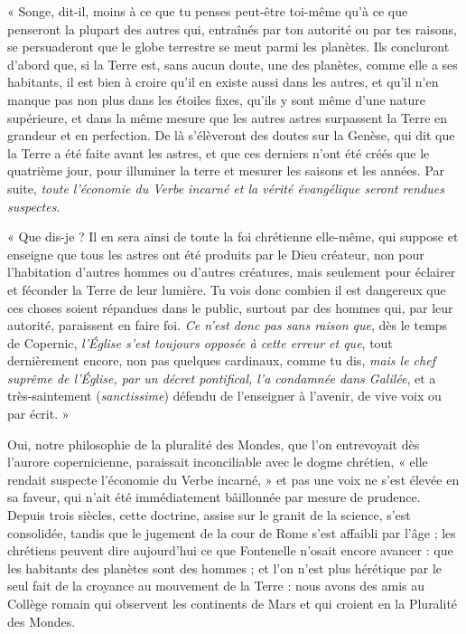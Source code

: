\documentclass[a4paper, 11pt, oneside, landscape]{article}
\begin{document}
« Songe, dit-il, moins à ce que tu penses peut-être toi-même qu'à ce que penseront la plupart des autres qui, entraînés par ton autorité ou par tes raisons, se persuaderont que le globe terrestre se meut parmi les planètes. Ils concluront d'abord que, si la Terre est, sans aucun doute, une des planètes, comme elle a ses habitants, il est bien à croire qu'il en existe aussi dans les autres, et qu'il n'en manque pas non plus dans les étoiles fixes, qu'ils y sont même d'une nature supérieure, et dans la même mesure que les autres astres surpassent la Terre en grandeur et en perfection. De là s'élèveront des doutes sur la Genèse, qui dit que la Terre a été faite avant les astres, et que ces derniers n'ont été créés que le quatrième jour, pour illuminer la terre et mesurer les saisons et les années. Par suite, \emph{toute l'économie du Verbe incarné et la vérité évangélique seront rendues suspectes}.

« Que dis-je ? Il en sera ainsi de toute la foi chrétienne elle-même, qui suppose et enseigne que tous les astres ont été produits par le Dieu créateur, non pour l'habitation d'autres hommes ou d'autres créatures, mais seulement pour éclairer et féconder la Terre de leur lumière. Tu vois donc combien il est dangereux que ces choses soient répandues dans le public, surtout par des hommes qui, par leur autorité, paraissent en faire foi. \emph{Ce n'est donc pas sans raison que}, dès le temps de Copernic, \emph{l'Église s'est toujours opposée à cette erreur et que}, tout dernièrement encore, non pas quelques cardinaux, comme tu dis, \emph{mais le chef suprême de l'Église, par un décret pontifical, l'a condamnée dans Galilée}, et a très-saintement (\emph{sanctissime}) défendu de l'enseigner à l'avenir, de vive voix ou par écrit. »

Oui, notre philosophie de la pluralité des Mondes, que l'on entrevoyait dès l'aurore copernicienne, paraissait inconciliable avec le dogme chrétien, « elle rendait suspecte l'économie du Verbe incarné, » et pas une voix ne s'est élevée en sa faveur, qui n'ait été immédiatement bâillonnée par mesure de prudence. Depuis trois siècles, cette doctrine, assise sur le granit de la science, s'est consolidée, tandis que le jugement de la cour de Rome s'est affaibli par l'âge ; les chrétiens peuvent dire aujourd'hui ce que Fontenelle n'osait encore avancer : que les habitants des planètes sont des hommes ; et l'on n'est plus hérétique par le seul fait de la croyance au mouvement de la Terre : nous avons des amis au Collège romain qui observent les continents de Mars et qui croient en la Pluralité des Mondes.
\end{document}
